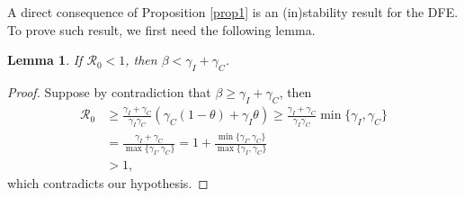 \documentclass[11pt,reqno]{amsart}
\newtheorem{lemma}{Lemma}
\theoremstyle{boldremark}
\begin{document}
A direct consequence of Proposition \ref{prop1} is an (in)stability result for the DFE. To prove such result, we first need the following lemma. 

\begin{lemma} \label{lemma1}
        If $\mathcal{R}_0<1$, then $\beta < \gamma_I + \gamma_C$. 
    \end{lemma}
    \begin{proof}
        Suppose by contradiction that $\beta \ge \gamma_I+\gamma_C$, then 
        \begin{equation*}
        \begin{split}
            \mathcal{R}_0 & \ge \frac{\gamma_I + \gamma_C}{\gamma_I \gamma_C} (\gamma_C(1-\theta)+\gamma_I \theta) \ge \frac{\gamma_I + \gamma_C}{\gamma_I \gamma_C} \min{\{\gamma_I, \gamma_C\}} \\ 
            &=\frac{\gamma_I + \gamma_C}{\max{\{\gamma_I, \gamma_C\}}} = 1+ \frac{\min{\{\gamma_I, \gamma_C\}}} {\max{\{\gamma_I, \gamma_C\}}} \\ 
            & > 1, 
        \end{split}
        \end{equation*}
        which contradicts our hypothesis. 
\end{proof}
\end{document}
